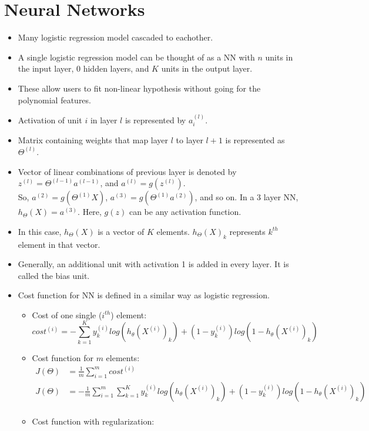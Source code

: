 \documentclass{article}
\begin{document}
\section{Neural Networks}
\begin{itemize}
	\item Many logistic regression model cascaded to eachother.
	\item A single logistic regression model can be thought of as a NN with $n$ units in the input layer, 0 hidden layers, and $K$ units in the output layer.
	\item These allow users to fit non-linear hypothesis without going for the polynomial features.
	\item Activation of unit $i$ in layer $l$ is represented by $a^{(l)}_i$.
	\item Matrix containing weights that map layer $l$ to layer $l+1$ is represented as $\Theta^{(l)}$.
	\item Vector of linear combinations of previous layer is denoted by $z^{(l)} = \Theta^{(l-1)} a^{(l-1)}$, and $a^{(l)}=g(z^{(l)})$.\\
	So, $a^{(2)}=g(\Theta^{(1)} X)$, $a^{(3)}=g(\Theta^{(1)} a^{(2)})$, and so on. In a 3 layer NN, $h_\Theta(X) = a^{(3)}$. Here, $g(z)$ can be any activation function.
	\item In this case, $h_\Theta(X)$ is a vector of $K$ elements. $h_\Theta(X)_k$ represents $k^{th}$ element in that vector.
	\item Generally, an additional unit with activation 1 is added in every layer. It is called the bias unit.
	\item Cost function for NN is defined in a similar way as logistic regression.
	\begin{itemize}
		\item Cost of one single ($i^{th}$) element:
		\begin{equation*}
			cost^{(i)} = -\sum_{k=1}^K y^{(i)}_klog(h_\theta(X^{(i)})_k) + (1-y^{(i)}_k)log(1-h_\theta(X^{(i)})_k)
		\end{equation*}
		\item Cost function for $m$ elements:
		\begin{align*}
			J(\Theta) &= \frac{1}{m} \sum_{i=1}^m cost^{(i)}\\
			J(\Theta) &= -\frac{1}{m} \sum_{i=1}^m \sum_{k=1}^K y^{(i)}_klog(h_\theta(X^{(i)})_k) + (1-y^{(i)}_k)log(1-h_\theta(X^{(i)})_k)\\
		\end{align*}
		\item Cost function with regularization:

\end{itemize}
\end{itemize}
\end{document}
